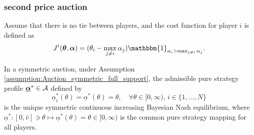 \subsubsection{second price auction}
Assume that there is no tie between players, and the cost function for player $i$ is defined as 
$$
	J^i(\btheta, \balpha) = (\theta_i - \max_{j \neq i} \alpha_j) \mathbbm{1}_{\alpha_i > \max_{j \neq i} \alpha_j}. 
$$

\begin{proposition}
	In a symmetric auction, under Assumption \ref{assumption:Auction_symmetric_full_support}, the admissible pure strategy profile $\underline{\boldsymbol{\alpha}}^* \in \mathcal{A}$ defined by  
	$$
	\underline{\alpha}^*_i(\theta) = \underline{\alpha}^*(\theta) = \theta, 
	\quad \forall \theta \in [0, \infty), \, i \in \{1,\ldots, N\}
	$$
	is the unique symmetric continuous increasing Bayesian Nash equilibrium, where $\underline{\alpha}^*: [0,\bar{v}] \ni \theta \mapsto \underline{\alpha}^*(\theta) = \theta \in [0, \infty)$ is the common pure strategy mapping for all players.
\end{proposition}

